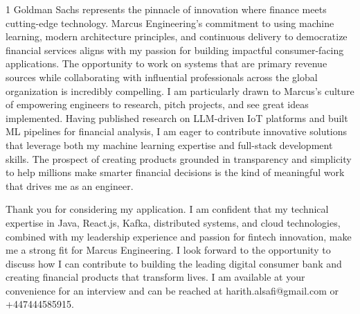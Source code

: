 \documentclass[11pt,a4paper,ragged2e]{altacv}
\begin{document}
\begin{paracol}{1}
Goldman Sachs represents the pinnacle of innovation where finance meets cutting-edge technology. Marcus Engineering's commitment to using machine learning, modern architecture principles, and continuous delivery to democratize financial services aligns with my passion for building impactful consumer-facing applications. The opportunity to work on systems that are primary revenue sources while collaborating with influential professionals across the global organization is incredibly compelling. I am particularly drawn to Marcus's culture of empowering engineers to research, pitch projects, and see great ideas implemented. Having published research on LLM-driven IoT platforms and built ML pipelines for financial analysis, I am eager to contribute innovative solutions that leverage both my machine learning expertise and full-stack development skills. The prospect of creating products grounded in transparency and simplicity to help millions make smarter financial decisions is the kind of meaningful work that drives me as an engineer.

Thank you for considering my application. I am confident that my technical expertise in Java, React.js, Kafka, distributed systems, and cloud technologies, combined with my leadership experience and passion for fintech innovation, make me a strong fit for Marcus Engineering. I look forward to the opportunity to discuss how I can contribute to building the leading digital consumer bank and creating financial products that transform lives. I am available at your convenience for an interview and can be reached at harith.alsafi@gmail.com or +447444585915.

\end{paracol}
\end{document}
